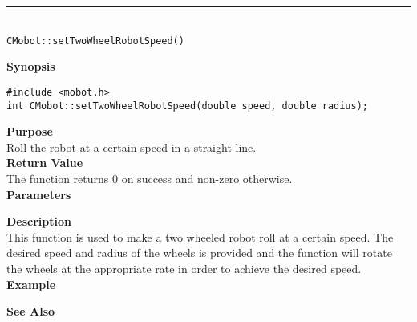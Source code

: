 \noindent
\vspace{5pt}
\rule{4.5in}{0.015in}\\
\noindent
{\LARGE \texttt{CMobot::setTwoWheelRobotSpeed()}}\\
{}

\noindent
{\bf Synopsis}
\vspace{-8pt}
\begin{verbatim}
#include <mobot.h>
int CMobot::setTwoWheelRobotSpeed(double speed, double radius);
\end{verbatim}

\noindent
{\bf Purpose}\\
Roll the robot at a certain speed in a straight line.\\

\noindent
{\bf Return Value}\\
The function returns 0 on success and non-zero otherwise.\\

\noindent
{\bf Parameters}
\vspace{-0.1in}

\noindent
{\bf Description}\\
This function is used to make a two wheeled robot roll at a certain speed. The desired 
speed and radius of the wheels is provided and the function will rotate the wheels at the
appropriate rate in order to achieve the desired speed.
\noindent\\
{\bf Example}\\
\noindent

\noindent
{\bf See Also}\\

